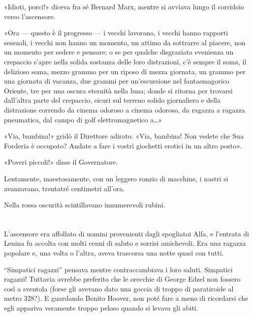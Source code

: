 \documentclass[
a5paper, %
10pt, %
twoside, 
onecolumn, %
openany, %
]{memoir}
\renewenvironment{shaded}{%
  \def\FrameCommand{\fboxsep=\FrameSep \colorbox{shadecolor}}%
  \MakeFramed{\advance\hsize-\width \FrameRestore\FrameRestore}}%
 {\endMakeFramed}
\begin{document}
\begin{shaded}
    «Idioti, porci!» diceva fra sé Bernard Marx, mentre si avviava lungo il corridoio verso l’ascensore.
\end{shaded}

«Ora — questo è il progresso — i vecchi lavorano, i vecchi hanno rapporti sessuali, i vecchi non hanno un momento, un attimo da sottrarre al piacere, non un momento per sedere e pensare; o se per qualche disgraziata evenienza un crepaccio s’apre nella solida sostanza delle loro distrazioni, c’è sempre il soma, il delizioso soma, mezzo grammo per un riposo di mezza giornata, un grammo per una giornata di vacanza, due grammi per un’escursione nel fantasmagorico Oriente, tre per una oscura eternità nella luna; donde si ritorna per trovarsi dall’altra parte del crepaccio, sicuri sul terreno solido giornaliero e della distrazione correndo da cinema odoroso a cinema odoroso, da ragazza a ragazza pneumatica, dal campo di golf elettromagnetico a…»

«Via, bambina!» gridò il Direttore adirato. «Via, bambina! Non vedete che Sua Forderia è occupato? Andate a fare i vostri giochetti erotici in un altro posto».

«Poveri piccoli!» disse il Governatore.

Lentamente, maestosamente, con un leggero ronzio di macchine, i nastri si avanzavano, trentatré centimetri all’ora.

Nella rossa oscurità scintillavano innumerevoli rubini.

\chapter{\phantom{title}}

\begin{center}
    {\huge\textbf{}}
    \end{center}

\lettrine{L}{\phantom{a}}’ascensore era affollato di uomini provenienti dagli spogliatoi Alfa, e l’entrata di Lenina fu accolta con molti cenni di saluto e sorrisi amichevoli. Era una ragazza popolare e, una volta o l’altra, aveva trascorsa una notte quasi con tutti.

“Simpatici ragazzi” pensava mentre contraccambiava i loro saluti. Simpatici ragazzi! Tuttavia avrebbe preferito che le orecchie di George Edzel non fossero così a sventola (forse gli avevano dato una goccia di troppo di paratiroide al metro 328?). E guardando Benito Hoover, non poté fare a meno di ricordarsi che egli appariva veramente troppo peloso quando si levava gli abiti.
\end{document}
